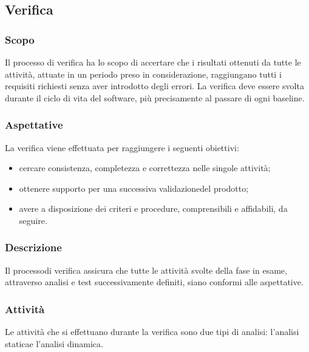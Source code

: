 \subsection{Verifica}
\subsubsection{Scopo}
Il processo di verifica ha lo scopo di accertare che i risultati ottenuti da tutte le attività, attuate in un periodo preso in considerazione, raggiungano tutti i requisiti richiesti senza aver introdotto degli errori. La verifica deve essere svolta durante il ciclo di vita del software, più precisamente al passare di ogni baseline\glo.
\subsubsection{Aspettative}
La verifica viene effettuata per raggiungere i seguenti obiettivi:
\begin{itemize}
	\item cercare consistenza, completezza e correttezza nelle singole attività;
	\item ottenere supporto per una successiva validazione\glosp del prodotto\glo;
	\item avere a disposizione dei criteri e procedure, comprensibili e affidabili, da seguire.
\end{itemize}
\subsubsection{Descrizione}
Il processo\glosp di verifica assicura che tutte le attività svolte della fase in esame, attraverso analisi e test successivamente definiti, siano conformi alle aspettative.
\subsubsection{Attività}
Le attività che si effettuano durante la verifica sono due tipi di analisi: l'analisi statica\glosp e l'analisi dinamica. \\[2mm]
